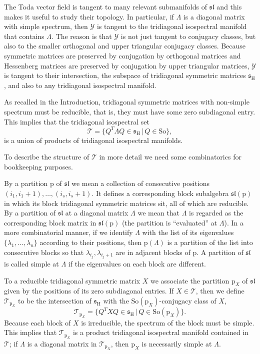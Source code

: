 \documentclass[reqno]{amsart}
\newcommand{\p}{\mathrm{p}}
\renewcommand{\ss}{\mathfrak{s}}
\renewcommand{\sl}{\mathfrak{sl}}
\newcommand{\cT}{\mathcal{T}}
\newcommand{\cY}{\mathcal{Y}}
\newcommand{\So}{\mathrm{So}}
\renewcommand{\H}{\mathrm{H}}
\begin{document}
The Toda vector field is tangent to many relevant submanifolds of $\sl$ and this makes it useful to study their topology. In particular,  if $\Lambda$ is a diagonal matrix with simple spectrum, then $\cY$ is tangent to the tridiagonal isospectral manifold that contains $\Lambda$. The reason is that $\cY$ is not just tangent to conjugacy classes, but also to the smaller orthogonal and upper triangular conjugacy classes.
Because symmetric matrices are preserved by conjugation by orthogonal matrices and Hessenberg matrices are preserved by conjugation by upper triangular matrices, $\cY$ is tangent to their intersection, the subspace  of tridiagonal symmetric matrices $\ss_\H$, and also to any tridiagonal isospectral manifold.

As recalled in the Introduction,  tridiagonal symmetric matrices with non-simple spectrum must be reducible, that is, they must have some zero subdiagonal entry. This implies that the tridiagonal isospectral set
\[\cT=\{Q^T\Lambda Q\in \ss_\H\,|\,Q\in \So\},\]
is a union of products of tridiagonal isospectral manifolds.

To describe the structure of $\cT$ in more detail we need some combinatorics for bookkeeping purposes.

By a partition $\p$ of $\sl$ we mean a collection of consecutive positions $(i_1,i_{1}+1),\dots ,(i_s,i_s+1)$. It defines a corresponding block subalgebra $\sl(\p)$ in which its block tridiagonal symmetric matrices sit, all of which are reducible. By a partition of $\sl$  at a diagonal matrix  $\Lambda$ we mean that $\Lambda$ is regarded as the corresponding block matrix in $\sl(\p)$ (the partition is ``evaluated'' at $\Lambda$). In a more combinatorial manner, if we identify $\Lambda$ with the list of its eigenvalues $\{\lambda_1,\dots,\lambda_n\}$ according to their positions,  then $\p(\Lambda)$ is a partition of the list into consecutive blocks so that $\lambda_{i_{j}},\lambda_{i_j+1}$ are in adjacent blocks of $\p$.
 A partition of $\sl$ is called simple at  $\Lambda$ if the eigenvalues on each block are different.

 To a reducible tridiagonal symmetric matrix $X$ we associate the partition $\p_X$ of $\sl$ given by the positions of its zero subdiagonal entries. If  $X\in \cT$, then we define $\cT_{\p_X}$ to be the intersection of $\ss_\H$ with the $\So(\p_X)$-conjugacy class of $X$,
 \[\cT_{\p_X}=\{Q^TXQ\in \ss_\H\,|\, Q\in \So(\p_X)\}.\]
 Because each block of $X$ is irreducible, the spectrum of the block must be simple. This implies that  $\cT_{\p_X}$ is a product tridiagonal isospectral manifold contained in $\cT$; if $\Lambda$ is a diagonal matrix in $\cT_{\p_X}$, then $\p_X$ is necessarily simple at $\Lambda$.
\end{document}
